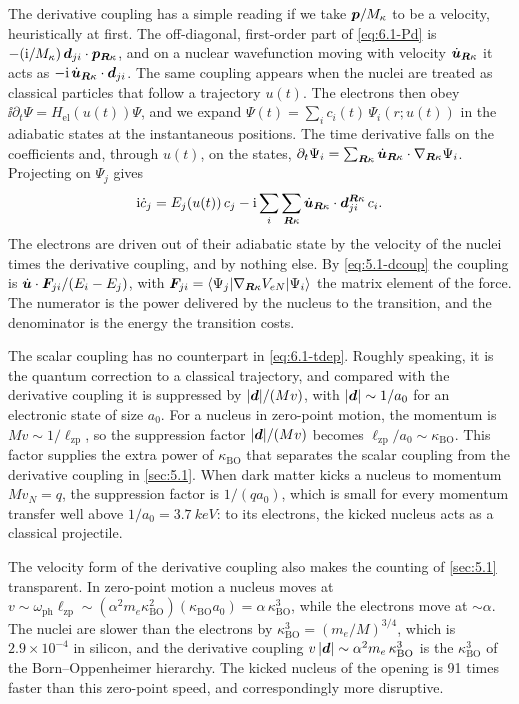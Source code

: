 The derivative coupling has a simple reading if we take $\bm{p}/M_\kappa$ to be a velocity, heuristically at first. The off-diagonal, first-order part of \cref{eq:6.1-Pd} is $-(\mathrm{i}/M_\kappa)\,\bm{d}_{ji}\cdot\bm{p}_{\bm{R}\kappa}$, and on a nuclear wavefunction moving with velocity $\dot{\bm{u}}_{\bm{R}\kappa}$ it acts as $-\mathrm{i}\,\dot{\bm{u}}_{\bm{R}\kappa}\cdot\bm{d}_{ji}$. The same coupling appears when the nuclei are treated as classical particles that follow a trajectory $u(t)$. The electrons then obey $\ii\partial_t\Psi = H_{\mathrm{el}}(u(t))\Psi$, and we expand $\Psi(t) = \sum_ic_i(t)\,\Psi_i(r;u(t))$ in the adiabatic states at the instantaneous positions. The time derivative falls on the coefficients and, through $u(t)$, on the states, $\partial_t\Psi_i = \sum_{\bm{R}\kappa}\dot{\bm{u}}_{\bm{R}\kappa}\cdot\nabla_{\bm{R}\kappa}\Psi_i$. Projecting on $\Psi_j$ gives
\begin{equation}
  \mathrm{i}\dot c_j = E_j(u(t))\,c_j - \mathrm{i}\sum_i\sum_{\bm{R}\kappa}\dot{\bm{u}}_{\bm{R}\kappa}\cdot\bm{d}^{\bm{R}\kappa}_{ji}\,c_i .
  \label{eq:6.1-tdep}
\end{equation}
The electrons are driven out of their adiabatic state by the velocity of the nuclei times the derivative coupling, and by nothing else. By \cref{eq:5.1-dcoup} the coupling is $\dot{\bm{u}}\cdot\bm{F}_{j i}/(E_i - E_j)$, with $\bm{F}_{ji} = \langle\Psi_j|\nabla_{\bm{R}\kappa}V_{eN}|\Psi_i\rangle$ the matrix element of the force. The numerator is the power delivered by the nucleus to the transition, and the denominator is the energy the transition costs.

The scalar coupling has no counterpart in \cref{eq:6.1-tdep}. Roughly speaking, it is the quantum correction to a classical trajectory, and compared with the derivative coupling it is suppressed by $|\bm{d}|/(Mv)$, with $|\bm{d}| \sim 1/a_0$ for an electronic state of size $a_0$. For a nucleus in zero-point motion, the momentum is $Mv \sim 1/\ell_{\mathrm{zp}}$, so the suppression factor $|\bm{d}|/(Mv)$ becomes $\ell_{\mathrm{zp}}/a_0 \sim \kappa_{\mathrm{BO}}$. This factor supplies the extra power of $\kappa_{\mathrm{BO}}$ that separates the scalar coupling from the derivative coupling in \cref{sec:5.1}. When dark matter kicks a nucleus to momentum $Mv_N = q$, the suppression factor is $1/(qa_0)$, which is small for every momentum transfer well above $1/a_0 = \SI{3.7}{keV}$: to its electrons, the kicked nucleus acts as a classical projectile.

The velocity form of the derivative coupling also makes the counting of \cref{sec:5.1} transparent. In zero-point motion a nucleus moves at $v \sim \omega_{\mathrm{ph}}\ell_{\mathrm{zp}} \sim (\alpha^2m_e\kappa_{\mathrm{BO}}^2)(\kappa_{\mathrm{BO}}a_0) = \alpha\,\kappa_{\mathrm{BO}}^3$, while the electrons move at $\sim\alpha$. The nuclei are slower than the electrons by $\kappa_{\mathrm{BO}}^3 = (m_e/M)^{3/4}$, which is $2.9\times10^{-4}$ in silicon, and the derivative coupling $v\,|\bm{d}| \sim \alpha^2m_e\,\kappa_{\mathrm{BO}}^3$ is the $\kappa_{\mathrm{BO}}^3$ of the Born--Oppenheimer hierarchy. The kicked nucleus of the opening is 91 times faster than this zero-point speed, and correspondingly more disruptive.

